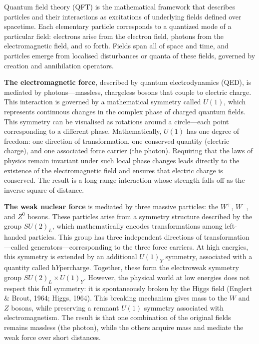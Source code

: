 Quantum field theory (QFT) is the mathematical framework that describes particles and their interactions as excitations of underlying fields defined over spacetime. Each elementary particle corresponds to a quantized mode of a particular field: electrons arise from the electron field, photons from the electromagnetic field, and so forth. Fields span all of space and time, and particles emerge from localised disturbances or quanta of these fields, governed by creation and annihilation operators.

\textbf{The electromagnetic force}, described by quantum electrodynamics (QED), is mediated by photons—massless, chargeless bosons that couple to electric charge. This interaction is governed by a mathematical symmetry called \(U(1)\), which represents continuous changes in the complex phase of charged quantum fields. This symmetry can be visualised as rotations around a circle—each point corresponding to a different phase. Mathematically, \(U(1)\) has one degree of freedom: one direction of transformation, one conserved quantity (electric charge), and one associated force carrier (the photon). Requiring that the laws of physics remain invariant under such local phase changes leads directly to the existence of the electromagnetic field and ensures that electric charge is conserved. The result is a long-range interaction whose strength falls off as the inverse square of distance.

\textbf{The weak nuclear force} is mediated by three massive particles: the \(W^+\), \(W^-\), and \(Z^0\) bosons. These particles arise from a symmetry structure described by the group \(SU(2)_L\), which mathematically encodes transformations among left-handed particles. This group has three independent directions of transformation—called generators—corresponding to the three force carriers. At high energies, this symmetry is extended by an additional \(U(1)_Y\) symmetry, associated with a quantity called h$Y$percharge. Together, these form the electroweak symmetry group \(SU(2)_L \times U(1)_Y\). However, the physical world at low energies does not respect this full symmetry: it is spontaneously broken by the Higgs field (Englert \& Brout, 1964; Higgs, 1964). This breaking mechanism gives mass to the \(W\) and \(Z\) bosons, while preserving a remnant \(U(1)\) symmetry associated with electromagnetism. The result is that one combination of the original fields remains massless (the photon), while the others acquire mass and mediate the weak force over short distances.


